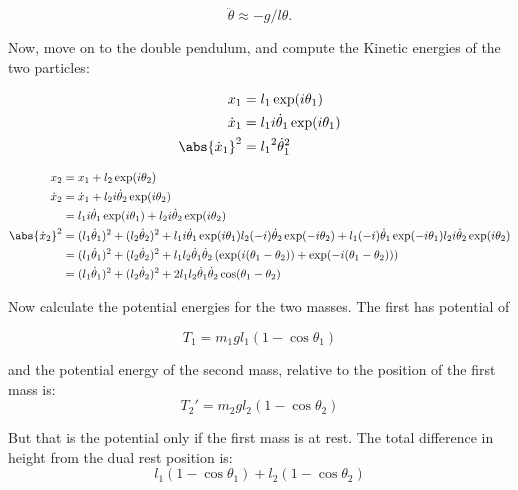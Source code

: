 \documentclass{article}
\newcommand{\dottheta}[0]{\dot{\theta}}
\newcommand{\ddottheta}[0]{\ddot{\theta}}
\newcommand{\xdot}[0]{\dot{x}}
\begin{document}
\begin{equation*}
\ddottheta \approx - g/l \theta.
\end{equation*}

Now, move on to the double pendulum, and compute the Kinetic energies of the two particles:

\begin{align*}
x_1 &= l_1 \exp(i\theta_1) \\
\xdot_1 &= l_1 i \dottheta_1 \exp(i\theta_1) \\
\abs{\xdot_1}^2 &= {l_1}^2 {\dottheta_1}^2 \\
\end{align*}

\begin{align*}
x_2 &= x_1 + l_2 \exp(i\theta_2) \\
\xdot_2 &= \xdot_1 + l_2 i \dottheta_2 \exp(i\theta_2) \\
        &= l_1 i \dottheta_1 \exp(i\theta_1) + l_2 i \dottheta_2 \exp(i\theta_2) \\
\abs{\xdot_2}^2
&= 
(l_1 \dottheta_1)^2 + (l_2 \dottheta_2)^2
+ l_1 i \dottheta_1 \exp(i\theta_1) l_2 (-i) \dottheta_2 \exp(-i\theta_2) 
+ l_1 (-i) \dottheta_1 \exp(-i\theta_1) l_2 i \dottheta_2 \exp(i\theta_2) \\
&= 
(l_1 \dottheta_1)^2 + (l_2 \dottheta_2)^2
+ l_1 l_2 \dottheta_1 \dottheta_2 \left( \exp(i(\theta_1 -\theta_2)) + \exp(-i(\theta_1 - \theta_2)) \right) \\
&= 
(l_1 \dottheta_1)^2 + (l_2 \dottheta_2)^2
+ 2 l_1 l_2 \dottheta_1 \dottheta_2 \cos(\theta_1 -\theta_2) \\
\end{align*}

Now calculate the potential energies for the two masses.  The first has potential of

\begin{equation*}
T_1 = m_1 g l_1 (1 - \cos\theta_1)
\end{equation*}

and the potential energy of the second mass, relative to the position of the first mass is:
\begin{equation*}
T_2' = m_2 g l_2 (1 - \cos\theta_2)
\end{equation*}

But that is the potential only if the first mass is at rest.  The total difference in height from the dual rest position is:
\begin{equation*}
l_1 (1 - \cos\theta_1) + l_2 (1 - \cos\theta_2)
\end{equation*}
\end{document}
